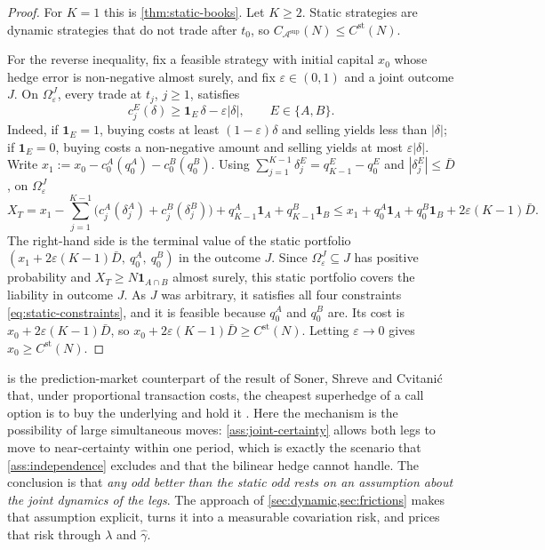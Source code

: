 \documentclass[11pt,a4paper]{article}
\theoremstyle{plain}
\theoremstyle{definition}
\theoremstyle{remark}
\newcommand{\1}{\mathbf{1}}
\begin{document}
\begin{proof}
For $K=1$ this is \cref{thm:static-books}. Let $K\geq 2$. Static strategies are dynamic strategies that do not trade after $t_0$, so $C_{\mathcal{A}^{\mathrm{sup}}}(N)\leq C^{\mathrm{st}}(N)$.

For the reverse inequality, fix a feasible strategy with initial capital $x_0$ whose hedge error is non-negative almost surely, and fix $\varepsilon\in(0,1)$ and a joint outcome $J$. On $\Omega^J_\varepsilon$, every trade at $t_j$, $j\geq 1$, satisfies
\[
c^E_j(\delta)\geq\1_E\,\delta - \varepsilon|\delta|,\qquad E\in\{A,B\}.
\]
Indeed, if $\1_E=1$, buying costs at least $(1-\varepsilon)\delta$ and selling yields less than $|\delta|$; if $\1_E=0$, buying costs a non-negative amount and selling yields at most $\varepsilon|\delta|$. Write $x_1 := x_0 - c^A_0(q^A_0) - c^B_0(q^B_0)$. Using $\sum_{j=1}^{K-1}\delta^E_j = q^E_{K-1}-q^E_0$ and $|\delta^E_j|\leq\bar D$, on $\Omega^J_\varepsilon$
\[
X_T = x_1 - \sum_{j=1}^{K-1}\bigl(c^A_j(\delta^A_j) + c^B_j(\delta^B_j)\bigr) + q^A_{K-1}\1_A + q^B_{K-1}\1_B \leq x_1 + q^A_0\1_A + q^B_0\1_B + 2\varepsilon(K-1)\bar D.
\]
The right-hand side is the terminal value of the static portfolio $(x_1 + 2\varepsilon(K-1)\bar D,\ q^A_0,\ q^B_0)$ in the outcome $J$. Since $\Omega^J_\varepsilon\subseteq J$ has positive probability and $X_T\geq N\1_{A\cap B}$ almost surely, this static portfolio covers the liability in outcome $J$. As $J$ was arbitrary, it satisfies all four constraints \eqref{eq:static-constraints}, and it is feasible because $q^A_0$ and $q^B_0$ are. Its cost is $x_0 + 2\varepsilon(K-1)\bar D$, so $x_0 + 2\varepsilon(K-1)\bar D\geq C^{\mathrm{st}}(N)$. Letting $\varepsilon\to 0$ gives $x_0\geq C^{\mathrm{st}}(N)$.
\end{proof}

 is the prediction-market counterpart of the result of Soner, Shreve and Cvitanić that, under proportional transaction costs, the cheapest superhedge of a call option is to buy the underlying and hold it \cite{SonerShreveCvitanic1995}. Here the mechanism is the possibility of large simultaneous moves: \cref{ass:joint-certainty} allows both legs to move to near-certainty within one period, which is exactly the scenario that \cref{ass:independence} excludes and that the bilinear hedge cannot handle. The conclusion is that \emph{any odd better than the static odd rests on an assumption about the joint dynamics of the legs}. The approach of \cref{sec:dynamic,sec:frictions} makes that assumption explicit, turns it into a measurable covariation risk, and prices that risk through $\lambda$ and $\hat\gamma$.
\end{document}
